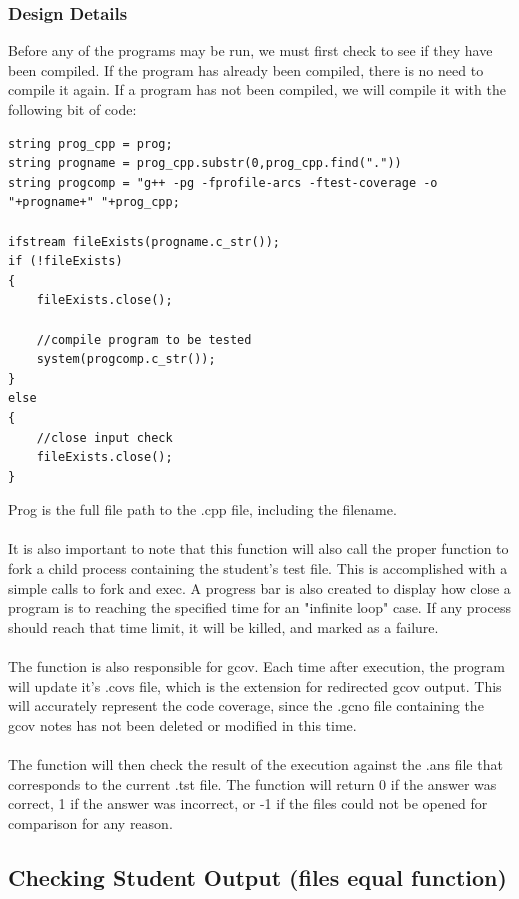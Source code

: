 \documentclass {article}
\begin{document}
			\subsubsection{\large{\color{cyan}Design Details}}
				Before any of the programs may be run, we must first check to see if they have
				 been compiled. If the program has already been compiled, there is no need to
				 compile it again. If a program has not been compiled, we will compile it with
				 the following bit of code:
\begin{lstlisting}
string prog_cpp = prog;
string progname = prog_cpp.substr(0,prog_cpp.find("."))
string progcomp = "g++ -pg -fprofile-arcs -ftest-coverage -o "+progname+" "+prog_cpp;

ifstream fileExists(progname.c_str());
if (!fileExists)
{
    fileExists.close();
    
    //compile program to be tested
    system(progcomp.c_str());
}
else
{
	//close input check
    fileExists.close();
}
\end{lstlisting} 

				Prog is the full file path to the .cpp file, including the filename.\\ \ \\It is
				 also important to note that this function will also call the proper function to
				 fork a child process containing the student's test file. This is accomplished 
				 with a simple calls to fork and exec. A progress bar is also created to display
				 how close a program is to reaching the specified time for an "infinite loop"
				 case. If any process should reach that time limit, it will be killed, and marked
				 as a failure.\\ \ \\The function is also responsible for gcov. Each time after
				 execution, the program will update it's .covs file, which is the extension for
				 redirected gcov output. This will accurately represent the code coverage, since
				 the .gcno file containing the gcov notes has not been deleted or modified in
				 this time. \\ \ \\The function will then check the result of the execution
				 against the .ans file that corresponds to the current .tst file. The function
				 will return 0 if the answer was correct, 1 if the answer was incorrect, or -1 if
				 the files could not be opened for comparison for any reason.
				 
		\subsection{\Large{\color{blue}Checking Student Output (files equal function)}}
\end{document}
